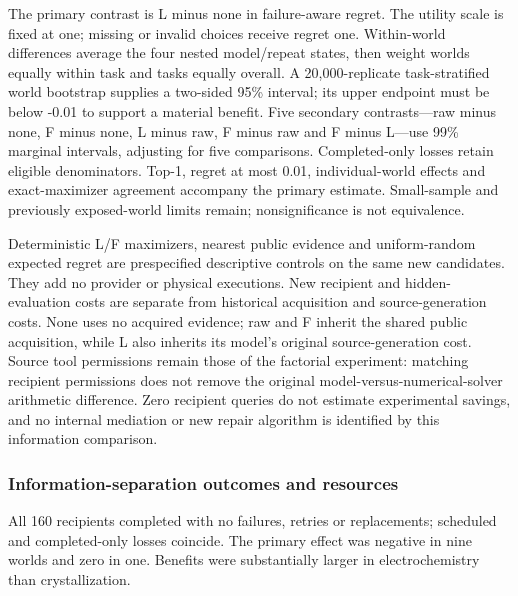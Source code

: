 \documentclass[10pt,twocolumn]{article}
\begin{document}
The primary contrast is L minus none in failure-aware regret. The
utility scale is fixed at one; missing or invalid choices receive regret
one. Within-world differences average the four nested model/repeat
states, then weight worlds equally within task and tasks equally
overall. A 20,000-replicate task-stratified world bootstrap supplies a
two-sided 95\% interval; its upper endpoint must be below -0.01 to
support a material benefit. Five secondary contrasts---raw minus none, F
minus none, L minus raw, F minus raw and F minus L---use 99\% marginal
intervals, adjusting for five comparisons. Completed-only losses retain
eligible denominators. Top-1, regret at most 0.01, individual-world
effects and exact-maximizer agreement accompany the primary estimate.
Small-sample and previously exposed-world limits remain; nonsignificance
is not equivalence.

Deterministic L/F maximizers, nearest public evidence and uniform-random
expected regret are prespecified descriptive controls on the same new
candidates. They add no provider or physical executions. New recipient
and hidden-evaluation costs are separate from historical acquisition and
source-generation costs. None uses no acquired evidence; raw and F
inherit the shared public acquisition, while L also inherits its model's
original source-generation cost. Source tool permissions remain those of
the factorial experiment: matching recipient permissions does not remove
the original model-versus-numerical-solver arithmetic difference. Zero
recipient queries do not estimate experimental savings, and no internal
mediation or new repair algorithm is identified by this information
comparison.

\subsubsection{Information-separation outcomes and
resources}\label{information-separation-outcomes-and-resources}

All 160 recipients completed with no failures, retries or replacements;
scheduled and completed-only losses coincide. The primary effect was
negative in nine worlds and zero in one. Benefits were substantially
larger in electrochemistry than crystallization.
\end{document}
